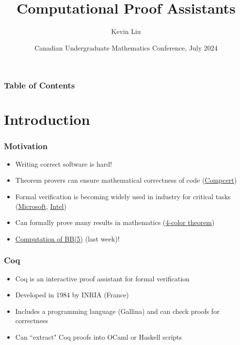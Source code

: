 \documentclass{beamer}
\title[Computational Proof Assistants] %
{Computational Proof Assistants}
\author[Liu, Kevin] %
{Kevin Liu}
\institute[UBC] %
\date[CUMC 2024] %
{Canadian Undergraduate Mathematics Conference, July 2024}
\begin{document}
\frame{\titlepage}


\begin{frame}
\frametitle{Table of Contents}
\tableofcontents
\end{frame}


\section{Introduction}

\begin{frame}
\frametitle{Motivation}

\begin{itemize}
    \item Writing correct software is hard!
    \item Theorem provers can ensure mathematical correctness of code (\href{https://compcert.org/}{Compcert})
    \item Formal verification is becoming widely used in industry for critical tasks (\href{https://www.youtube.com/watch?v=GEsvGGp0jyQ}{Microsoft}, \href{https://www.cl.cam.ac.uk/~jrh13/slides/nijmegen-21jun02/slides.pdf}{Intel})
    \item Can formally prove many results in mathematics (\href{https://github.com/coq-community/fourcolor}{4-color theorem})
    \item \href{https://github.com/ccz181078/Coq-BB5}{Computation of BB(5)} (last week)!
\end{itemize}
\end{frame}



\begin{frame}
\frametitle{Coq}
\begin{itemize}
    \item Coq is an interactive proof assistant for formal verification
    \item Developed in 1984 by INRIA (France)
    \item Includes a programming language (Gallina) and can check proofs for correctness
    \item Can ``extract" Coq proofs into OCaml or Haskell scripts
\end{itemize}
\end{frame}
\end{document}
